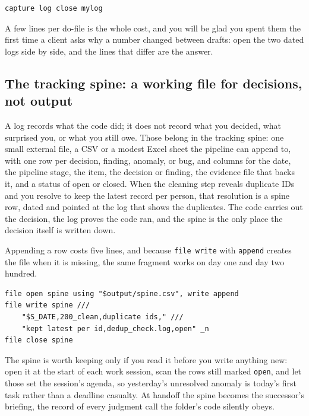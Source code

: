 \par
{\footnotesize
\begin{verbatim}
capture log close mylog
\end{verbatim}
}
A few lines per do-file is the whole cost, and you will be glad you spent them the first time a client asks why a number changed between drafts: open the two dated logs side by side, and the lines that differ are the answer.

\subsection{The tracking spine: a working file for decisions, not output}\label{sec:ch02-spine}
A log records what the code did; it does not record what you decided, what surprised you, or what you still owe. Those belong in the tracking spine: one small external file, a CSV or a modest Excel sheet the pipeline can append to, with one row per decision, finding, anomaly, or bug, and columns for the date, the pipeline stage, the item, the decision or finding, the evidence file that backs it, and a status of open or closed. When the cleaning step reveals duplicate IDs and you resolve to keep the latest record per person, that resolution is a spine row, dated and pointed at the log that shows the duplicates. The code carries out the decision, the log proves the code ran, and the spine is the only place the decision itself is written down.

Appending a row costs five lines, and because \texttt{file write} with \texttt{append} creates the file when it is missing, the same fragment works on day one and day two hundred.
\par
{\footnotesize
\begin{verbatim}
file open spine using "$output/spine.csv", write append
file write spine ///
    "$S_DATE,200_clean,duplicate ids," ///
    "kept latest per id,dedup_check.log,open" _n
file close spine
\end{verbatim}
}
The spine is worth keeping only if you read it before you write anything new: open it at the start of each work session, scan the rows still marked \texttt{open}, and let those set the session's agenda, so yesterday's unresolved anomaly is today's first task rather than a deadline casualty. At handoff the spine becomes the successor's briefing, the record of every judgment call the folder's code silently obeys.

